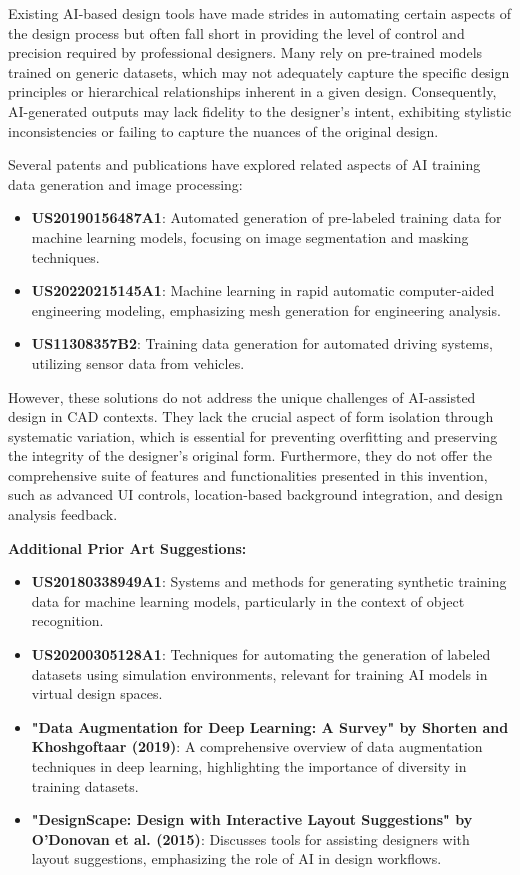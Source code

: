 \documentclass{article}
\begin{document}
Existing AI-based design tools have made strides in automating certain aspects of the design process but often fall short in providing the level of control and precision required by professional designers. Many rely on pre-trained models trained on generic datasets, which may not adequately capture the specific design principles or hierarchical relationships inherent in a given design. Consequently, AI-generated outputs may lack fidelity to the designer's intent, exhibiting stylistic inconsistencies or failing to capture the nuances of the original design.

Several patents and publications have explored related aspects of AI training data generation and image processing:

\begin{itemize}
    \item \textbf{US20190156487A1}: Automated generation of pre-labeled training data for machine learning models, focusing on image segmentation and masking techniques.
    \item \textbf{US20220215145A1}: Machine learning in rapid automatic computer-aided engineering modeling, emphasizing mesh generation for engineering analysis.
    \item \textbf{US11308357B2}: Training data generation for automated driving systems, utilizing sensor data from vehicles.
\end{itemize}

However, these solutions do not address the unique challenges of AI-assisted design in CAD contexts. They lack the crucial aspect of form isolation through systematic variation, which is essential for preventing overfitting and preserving the integrity of the designer's original form. Furthermore, they do not offer the comprehensive suite of features and functionalities presented in this invention, such as advanced UI controls, location-based background integration, and design analysis feedback.

\textbf{Additional Prior Art Suggestions:}

\begin{itemize}
    \item \textbf{US20180338949A1}: Systems and methods for generating synthetic training data for machine learning models, particularly in the context of object recognition.
    \item \textbf{US20200305128A1}: Techniques for automating the generation of labeled datasets using simulation environments, relevant for training AI models in virtual design spaces.
    \item \textbf{"Data Augmentation for Deep Learning: A Survey" by Shorten and Khoshgoftaar (2019)}: A comprehensive overview of data augmentation techniques in deep learning, highlighting the importance of diversity in training datasets.
    \item \textbf{"DesignScape: Design with Interactive Layout Suggestions" by O'Donovan et al. (2015)}: Discusses tools for assisting designers with layout suggestions, emphasizing the role of AI in design workflows.
\end{itemize}
\end{document}
